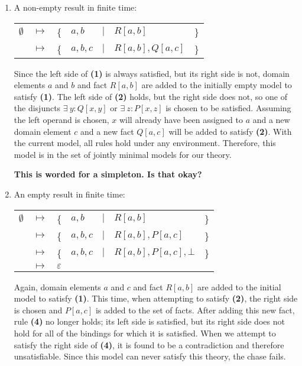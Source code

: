 		\begin{enumerate}
		\item A non-empty result in finite time:

			\begin{tabular}{lllllll}
				$\emptyset$ & $\mapsto$ & \{ & $a,b$   & $|$ & $R[a,b]$         & \} \\
				{}          & $\mapsto$ & \{ & $a,b,c$ & $|$ & $R[a,b], Q[a,c]$ & \} \\
			\end{tabular}

			Since the left side of \textbf{(1)} is always satisfied, but its
			right side is not, domain elements $a$ and $b$ and fact $R[a,b]$
			are added to the initially empty model to satisfy \textbf{(1)}. The
			left side of \textbf{(2)} holds, but the right side does not, so
			one of the disjuncts $\exists\ y : Q[x,y]$ or $\exists\ z: P[x,z]$
			is chosen to be satisfied. Assuming the left operand is chosen, $x$
			will already have been assigned to $a$ and a new domain element $c$
			and a new fact $Q[a,c]$ will be added to satisfy \textbf{(2)}. With
			the current model, all rules hold under any environment. Therefore,
			this model is in the set of jointly minimal models for our theory.

			\textbf{This is worded for a simpleton. Is that okay?}

		\item An empty result in finite time:

			\begin{tabular}{lllllll}
				$\emptyset$ & $\mapsto$ & \{ & $a,b$   & $|$ & $R[a,b]$               & \} \\
				{}          & $\mapsto$ & \{ & $a,b,c$ & $|$ & $R[a,b], P[a,c]$       & \} \\
				{}          & $\mapsto$ & \{ & $a,b,c$ & $|$ & $R[a,b], P[a,c], \bot$ & \} \\
				{}          & $\mapsto$ & \multicolumn{5}{l}{ $\varepsilon$ } \\
			\end{tabular}

			Again, domain elements $a$ and $c$ and fact $R[a,b]$ are added to
			the initial model to satisfy \textbf{(1)}.  This time, when
			attempting to satisfy \textbf{(2)}, the right side is chosen and
			$P[a,c]$ is added to the set of facts. After adding this new fact,
			rule \textbf{(4)} no longer holds; its left side is satisfied, but
			its right side does not hold for all of the bindings for which it
			is satisfied. When we attempt to satisfy the right side of
			\textbf{(4)}, it is found to be a contradiction and therefore
			unsatisfiable. Since this model can never satisfy this theory, the
			chase fails.


\end{enumerate}
